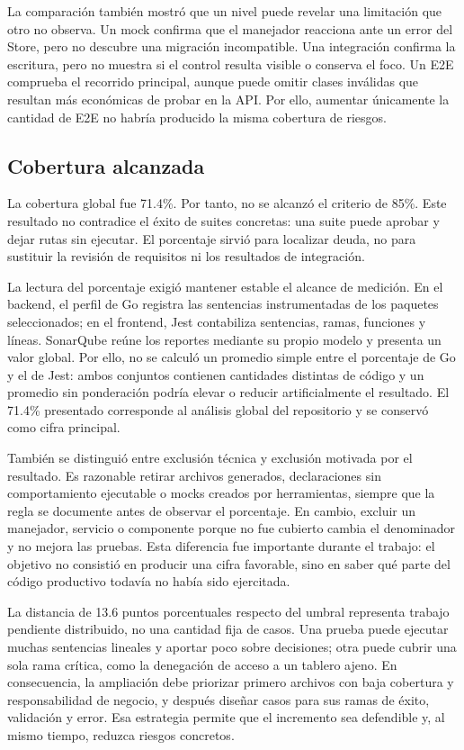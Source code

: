 \documentclass[conference]{IEEEtran}
\begin{document}
La comparación también mostró que un nivel puede revelar una limitación que otro no observa. Un mock confirma que el manejador reacciona ante un error del Store, pero no descubre una migración incompatible. Una integración confirma la escritura, pero no muestra si el control resulta visible o conserva el foco. Un E2E comprueba el recorrido principal, aunque puede omitir clases inválidas que resultan más económicas de probar en la API. Por ello, aumentar únicamente la cantidad de E2E no habría producido la misma cobertura de riesgos.
\vspace{\baselineskip}

\subsection{Cobertura alcanzada}
La cobertura global fue 71.4\%. Por tanto, no se alcanzó el criterio de 85\%. Este resultado no contradice el éxito de suites concretas: una suite puede aprobar y dejar rutas sin ejecutar. El porcentaje sirvió para localizar deuda, no para sustituir la revisión de requisitos ni los resultados de integración.

La lectura del porcentaje exigió mantener estable el alcance de medición. En el backend, el perfil de Go registra las sentencias instrumentadas de los paquetes seleccionados; en el frontend, Jest contabiliza sentencias, ramas, funciones y líneas. SonarQube reúne los reportes mediante su propio modelo y presenta un valor global. Por ello, no se calculó un promedio simple entre el porcentaje de Go y el de Jest: ambos conjuntos contienen cantidades distintas de código y un promedio sin ponderación podría elevar o reducir artificialmente el resultado. El 71.4\% presentado corresponde al análisis global del repositorio y se conservó como cifra principal.

También se distinguió entre exclusión técnica y exclusión motivada por el resultado. Es razonable retirar archivos generados, declaraciones sin comportamiento ejecutable o mocks creados por herramientas, siempre que la regla se documente antes de observar el porcentaje. En cambio, excluir un manejador, servicio o componente porque no fue cubierto cambia el denominador y no mejora las pruebas. Esta diferencia fue importante durante el trabajo: el objetivo no consistió en producir una cifra favorable, sino en saber qué parte del código productivo todavía no había sido ejercitada.

La distancia de 13.6 puntos porcentuales respecto del umbral representa trabajo pendiente distribuido, no una cantidad fija de casos. Una prueba puede ejecutar muchas sentencias lineales y aportar poco sobre decisiones; otra puede cubrir una sola rama crítica, como la denegación de acceso a un tablero ajeno. En consecuencia, la ampliación debe priorizar primero archivos con baja cobertura y responsabilidad de negocio, y después diseñar casos para sus ramas de éxito, validación y error. Esa estrategia permite que el incremento sea defendible y, al mismo tiempo, reduzca riesgos concretos.
\vspace{\baselineskip}
\end{document}
